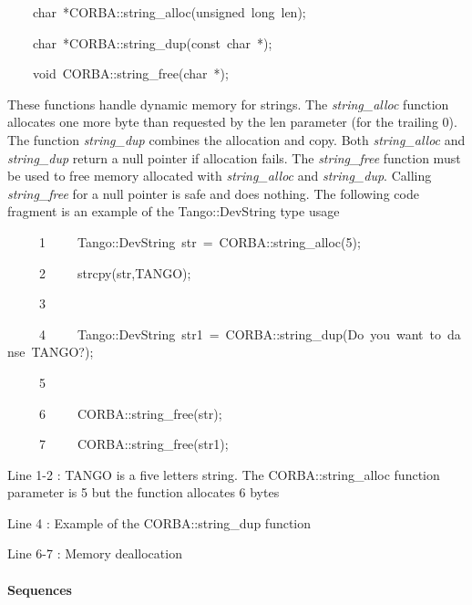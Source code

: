 
\begin{lyxcode}
~~~~char~{*}CORBA::string\_alloc(unsigned~long~len);

~~~~char~{*}CORBA::string\_dup(const~char~{*});

~~~~void~CORBA::string\_free(char~{*});
\end{lyxcode}


These functions handle dynamic memory for strings. The \emph{string\_alloc}
function allocates one more byte than requested by the len parameter
(for the trailing 0). The function \emph{string\_dup}
combines the allocation and copy. Both \emph{string\_alloc} and \emph{string\_dup}
return a null pointer if allocation fails. The \emph{string\_free}
function must be used to free memory allocated with \emph{string\_alloc}
and \emph{string\_dup}. Calling \emph{string\_free} for a null pointer
is safe and does nothing. The following code fragment is an example
of the Tango::DevString type usage


\begin{lyxcode}
~~~~~1~~~~~Tango::DevString~str~=~CORBA::string\_alloc(5);

~~~~~2~~~~~strcpy(str,\textquotedbl{}TANGO\textquotedbl{});

~~~~~3~~

~~~~~4~~~~~Tango::DevString~str1~=~CORBA::string\_dup(\textquotedbl{}Do~you~want~to~danse~TANGO?\textquotedbl{});

~~~~~5~~

~~~~~6~~~~~CORBA::string\_free(str);

~~~~~7~~~~~CORBA::string\_free(str1);
\end{lyxcode}


Line 1-2 : TANGO is a five letters string. The CORBA::string\_alloc
function parameter is 5 but the function allocates 6 bytes

Line 4 : Example of the CORBA::string\_dup function

Line 6-7 : Memory deallocation


\paragraph{Sequences}

